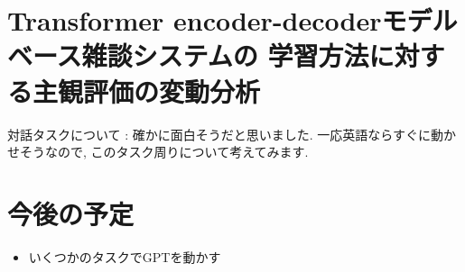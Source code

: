 \documentclass[twocolumn]{jarticle}     %
\begin{document}
\section{Transformer encoder-decoderモデルベース雑談システムの
学習方法に対する主観評価の変動分析}
対話タスクについて : 確かに面白そうだと思いました.
一応英語ならすぐに動かせそうなので, このタスク周りについて考えてみます.

\section{今後の予定}
\begin{itemize}
  \item いくつかのタスクでGPTを動かす
\end{itemize}



\end{document}
